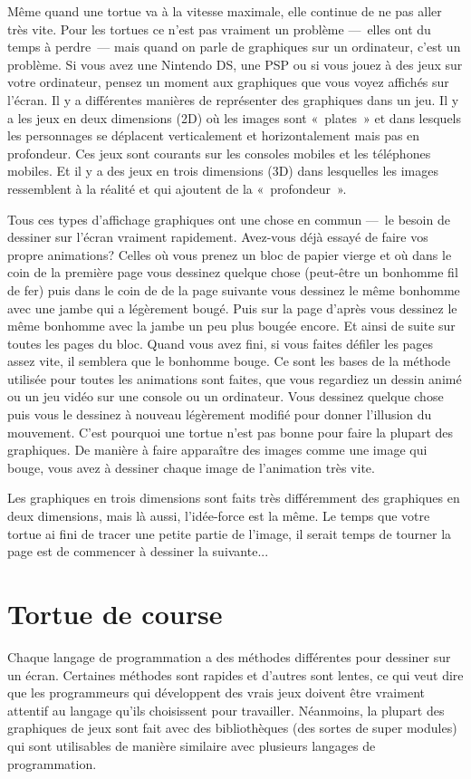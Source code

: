 Même quand une tortue va à la vitesse maximale, elle continue de ne pas aller très vite.
Pour les tortues ce n'est pas vraiment un problème --- elles ont du temps à perdre --- mais quand on parle de graphiques sur un ordinateur, c'est un problème. Si vous avez une Nintendo DS, une PSP ou si vous jouez à des 
jeux sur votre ordinateur, pensez un moment aux graphiques que vous voyez affichés sur l'écran. Il y a différentes
manières de représenter des graphiques dans un jeu. Il y a les jeux en deux dimensions (2D) où les images sont « plates » et dans lesquels les personnages se déplacent verticalement et horizontalement mais pas en profondeur.
Ces jeux sont courants sur les consoles mobiles et les téléphones mobiles. Et il y a des jeux en trois dimensions (3D) dans lesquelles les images ressemblent à la réalité et qui ajoutent de la « profondeur ».

Tous ces types d'affichage graphiques ont une chose en commun --- le besoin de dessiner sur l'écran vraiment rapidement. Avez-vous déjà essayé de faire vos propre animations? Celles où vous prenez un bloc de papier vierge et où dans le coin de la première page vous dessinez quelque chose (peut-être un bonhomme fil de fer) puis dans le coin de de la page suivante vous dessinez le même bonhomme avec une jambe qui a légèrement bougé. Puis sur la page d'après vous dessinez le même bonhomme avec la jambe un peu plus bougée encore. Et ainsi de suite sur toutes les pages du bloc. Quand vous avez fini, si vous faites défiler les pages assez vite, il semblera que le bonhomme bouge. Ce sont les bases de la méthode utilisée pour toutes les animations sont faites, que vous regardiez un dessin animé ou un jeu vidéo sur une console ou un ordinateur. Vous dessinez quelque chose puis vous le dessinez à nouveau légèrement modifié pour donner l'illusion du mouvement. C'est pourquoi une tortue n'est pas bonne pour faire la plupart des graphiques. De manière à faire apparaître des images comme une image qui bouge, vous avez à dessiner chaque image de l'animation très vite.

Les graphiques en trois dimensions sont faits très différemment des graphiques en deux dimensions, mais là aussi, l'idée-force est la même. Le temps que votre tortue ai fini de tracer une petite partie de l'image, il serait temps de tourner la page est de commencer à dessiner la suivante...



\section{Tortue de course}
Chaque langage de programmation a des méthodes différentes pour dessiner sur un écran. Certaines méthodes sont rapides et d'autres sont lentes, ce qui veut dire que les programmeurs qui développent des vrais jeux 
doivent être vraiment attentif au langage qu'ils choisissent pour travailler. Néanmoins, la plupart des graphiques de jeux sont fait avec des bibliothèques (des sortes de super modules) qui sont utilisables de manière similaire avec plusieurs langages de programmation.

